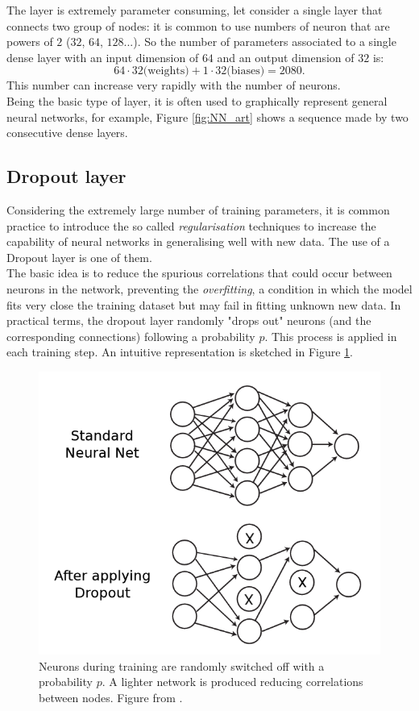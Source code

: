 The layer is extremely parameter consuming, let consider a single layer that connects two group of nodes: it is common to use numbers of neuron that are powers of $2$ ($32$, $64$, $128$...). So the number of parameters associated to a single dense layer with an input dimension of $64$ and an output dimension of $32$ is:
\begin{equation*}
    64 \cdot 32 \text{(weights)} + 1 \cdot 32 \text{(biases)} = 2080.
\end{equation*}
This number can increase very rapidly with the number of neurons.\\
Being the basic type of layer, it is often used to graphically represent general neural networks, for example, Figure \ref{fig:NN_art} shows a sequence made by two consecutive dense layers.

\subsection*{Dropout layer}
Considering the extremely large number of training parameters, it is common practice to introduce the so called \textit{regularisation} techniques to increase the capability of neural networks in generalising well with new data. The use of a Dropout layer is one of them.\\
The basic idea is to reduce the spurious correlations that could occur between neurons in the network, preventing the \textit{overfitting}, a condition in which the model fits very close the training dataset but may fail in fitting unknown new data. In practical terms, the dropout layer randomly "drops out" neurons (and the corresponding connections) following a probability $p$. This process is applied in each training step. An intuitive representation is sketched in Figure \ref{fig:Drop}.

\begin{figure}
	\centering
	\includegraphics[width=.6\textwidth]{IMG/Cap6/Dropout.png}
	\caption{Neurons during training are randomly switched off with a probability $p$. A lighter network is produced reducing correlations between nodes. Figure from \cite{ML4ph}.}
	\label{fig:Drop}
\end{figure}

